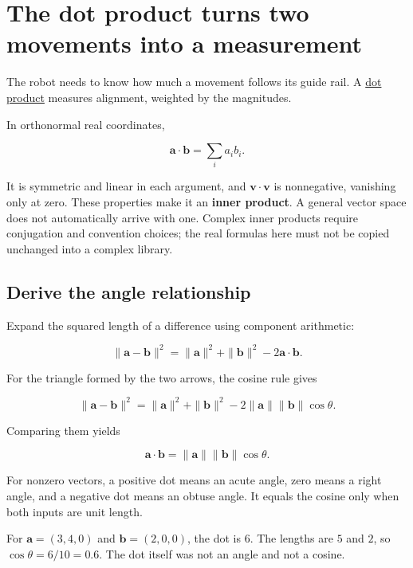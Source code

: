 \section{The dot product turns two movements into a measurement}\label{01-foundations-i-ch017-the-dot-product-turns-two-movements-into-a-measurement}

The robot needs to know how much a movement follows its guide rail. A \hyperref[01-foundations-i-ch017-the-dot-product-turns-two-movements-into-a-measurement]{dot product} measures alignment, weighted by the magnitudes.

In orthonormal real coordinates,

\[
\mathbf a\cdot\mathbf b=\sum_i a_i b_i.
\]

It is symmetric and linear in each argument, and \(\mathbf v\cdot\mathbf v\) is nonnegative, vanishing only at zero. These properties make it an \textbf{inner product}. A general vector space does not automatically arrive with one. Complex inner products require conjugation and convention choices; the real formulas here must not be copied unchanged into a complex library.

\subsection{Derive the angle relationship}\label{01-foundations-i-ch017-derive-the-angle-relationship}

Expand the squared length of a difference using component arithmetic:

\[
\|\mathbf a-\mathbf b\|^2
=\|\mathbf a\|^2+\|\mathbf b\|^2-2\mathbf a\cdot\mathbf b.
\]

For the triangle formed by the two arrows, the cosine rule gives

\[
\|\mathbf a-\mathbf b\|^2
=\|\mathbf a\|^2+\|\mathbf b\|^2
-2\|\mathbf a\|\|\mathbf b\|\cos\theta.
\]

Comparing them yields

\[
\mathbf a\cdot\mathbf b=\|\mathbf a\|\|\mathbf b\|\cos\theta.
\]

For nonzero vectors, a positive dot means an acute angle, zero means a right angle, and a negative dot means an obtuse angle. It equals the cosine only when both inputs are unit length.

For \(\mathbf a=(3,4,0)\) and \(\mathbf b=(2,0,0)\), the dot is \(6\). The lengths are \(5\) and \(2\), so \(\cos\theta=6/10=0.6\). The dot itself was not an angle and not a cosine.

